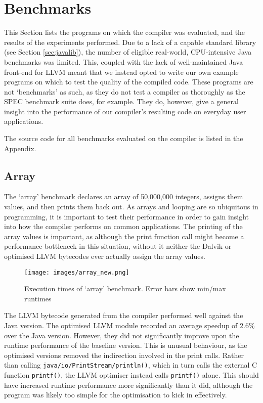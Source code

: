 \section{Benchmarks}
\label{sec:benchmarks}

This Section lists the programs on which the compiler was evaluated, and the results of the experiments performed. Due to a lack of a capable standard library (see Section \ref{sec:javalib}), the number of eligible real-world, CPU-intensive Java benchmarks was limited. This, coupled with the lack of well-maintained Java front-end for LLVM meant that we instead opted to write our own example programs on which to test the quality of the compiled code. These programs are not `benchmarks' as such, as they do not test a compiler as thoroughly as the SPEC benchmark suite does, for example. They do, however, give a general insight into the performance of our compiler's resulting code on everyday user applications.

The source code for all benchmarks evaluated on the compiler is listed in the Appendix.

\subsection*{Array}

The `array' benchmark declares an array of 50,000,000 integers, assigns them values, and then prints them back out. As arrays and looping are so ubiquitous in programming, it is important to test their performance in order to gain insight into how the compiler performs on common applications. The printing of the array values is important, as although the print function call might become a performance bottleneck in this situation, without it neither the Dalvik or optimised LLVM bytecodes ever actually assign the array values.

\begin{figure}[h!]
    \centering
    \texttt{[image: images/array\_new.png]}
    \caption[Execution times of `array' benchmark]{Execution times of `array' benchmark. Error bars show min/max runtimes}
    \label{fig:res_array}
\end{figure}

The LLVM bytecode generated from the compiler performed well against the Java version. The optimised LLVM module recorded an average speedup of 2.6\% over the Java version. However, they did not significantly improve upon the runtime performance of the baseline version. This is unusual behaviour, as the optimised versions removed the indirection involved in the print calls. Rather than calling \verb|java/io/PrintStream/println()|, which in turn calls the external C function \verb|printf()|, the LLVM optimiser instead calls \verb|printf()| alone. This should have increased runtime performance more significantly than it did, although the program was likely too simple for the optimisation to kick in effectively.

